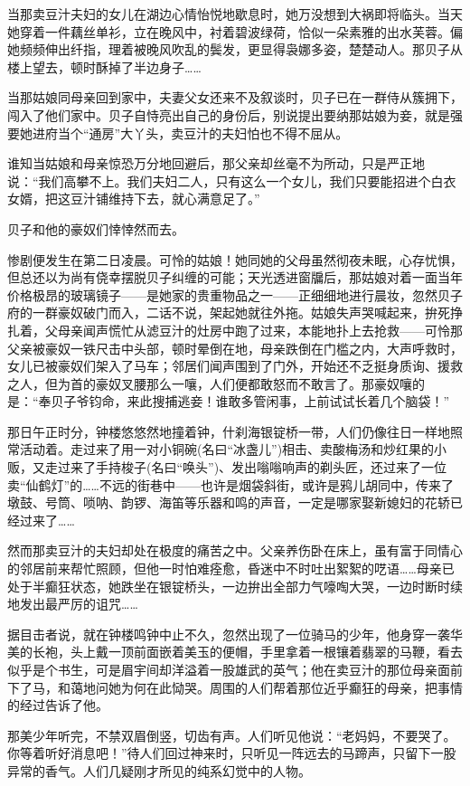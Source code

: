 \par 当那卖豆汁夫妇的女儿在湖边心情怡悦地歇息时，她万没想到大祸即将临头。当天她穿着一件藕丝单衫，立在晚风中，衬着碧波绿荷，恰似一朵素雅的出水芙蓉。偏她频频伸出纤指，理着被晚风吹乱的鬓发，更显得袅娜多姿，楚楚动人。那贝子从楼上望去，顿时酥掉了半边身子……
\par 当那姑娘同母亲回到家中，夫妻父女还来不及叙谈时，贝子已在一群侍从簇拥下，闯入了他们家中。贝子自恃亮出自己的身份后，别说提出要纳那姑娘为妾，就是强要她进府当个“通房”大丫头，卖豆汁的夫妇怕也不得不屈从。
\par 谁知当姑娘和母亲惊恐万分地回避后，那父亲却丝毫不为所动，只是严正地说：“我们高攀不上。我们夫妇二人，只有这么一个女儿，我们只要能招进个白衣女婿，把这豆汁铺维持下去，就心满意足了。”
\par 贝子和他的豪奴们悻悻然而去。
\par 惨剧便发生在第二日凌晨。可怜的姑娘！她同她的父母虽然彻夜未眠，心存忧惧，但总还以为尚有侥幸摆脱贝子纠缠的可能；天光透进窗牖后，那姑娘对着一面当年价格极昂的玻璃镜子——是她家的贵重物品之一——正细细地进行晨妆，忽然贝子府的一群豪奴破门而入，二话不说，架起她就往外拖。姑娘失声哭喊起来，拚死挣扎着，父母亲闻声慌忙从滤豆汁的灶房中跑了过来，本能地扑上去抢救——可怜那父亲被豪奴一铁尺击中头部，顿时晕倒在地，母亲跌倒在门槛之内，大声呼救时，女儿已被豪奴们架入了马车；邻居们闻声围到了门外，开始还不乏挺身质询、援救之人，但为首的豪奴叉腰那么一嚷，人们便都敢怒而不敢言了。那豪奴嚷的是：“奉贝子爷钧命，来此搜捕逃妾！谁敢多管闲事，上前试试长着几个脑袋！”
\par 那日午正时分，钟楼悠悠然地撞着钟，什刹海银锭桥一带，人们仍像往日一样地照常活动着。走过来了用一对小铜碗(名曰“冰盏儿”)相击、卖酸梅汤和炒红果的小贩，又走过来了手持梭子(名曰“唤头”)、发出嗡嗡响声的剃头匠，还过来了一位卖“仙鹤灯”的……不远的街巷中——也许是烟袋斜街，或许是鸦儿胡同中，传来了墩鼓、号筒、唢呐、韵锣、海笛等乐器和鸣的声音，一定是哪家娶新媳妇的花轿已经过来了……
\par 然而那卖豆汁的夫妇却处在极度的痛苦之中。父亲养伤卧在床上，虽有富于同情心的邻居前来帮忙照顾，但他一时怕难痊愈，昏迷中不时吐出絮絮的呓语……母亲已处于半癫狂状态，她跌坐在银锭桥头，一边拚出全部力气嚎啕大哭，一边时断时续地发出最严厉的诅咒……
\par 据目击者说，就在钟楼鸣钟中止不久，忽然出现了一位骑马的少年，他身穿一袭华美的长袍，头上戴一顶前面嵌着美玉的便帽，手里拿着一根镶着翡翠的马鞭，看去似乎是个书生，可是眉宇间却洋溢着一股雄武的英气；他在卖豆汁的那位母亲面前下了马，和蔼地问她为何在此恸哭。周围的人们帮着那位近乎癫狂的母亲，把事情的经过告诉了他。
\par 那美少年听完，不禁双眉倒竖，切齿有声。人们听见他说：“老妈妈，不要哭了。你等着听好消息吧！”待人们回过神来时，只听见一阵远去的马蹄声，只留下一股异常的香气。人们几疑刚才所见的纯系幻觉中的人物。
